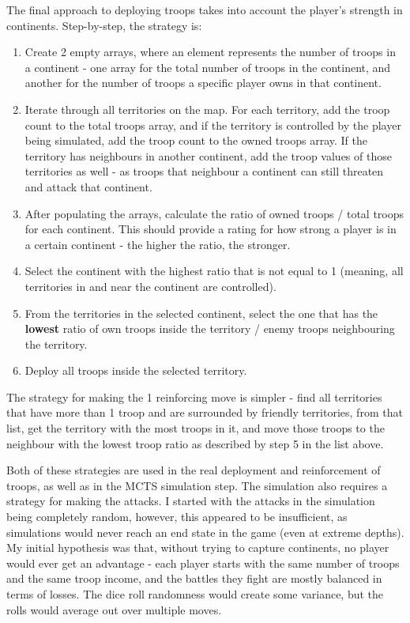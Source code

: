 The final approach to deploying troops takes into account the player's strength in continents. Step-by-step, the strategy is:
\begin{enumerate}
\item Create 2 empty arrays, where an element represents the number of troops in a continent - one array for the total number of troops in the continent, and another for the number of troops a specific player owns in that continent.
\item Iterate through all territories on the map. For each territory, add the troop count to the total troops array, and if the territory is controlled by the player being simulated, add the troop count to the owned troops array. If the territory has neighbours in another continent, add the troop values of those territories as well - as troops that neighbour a continent can still threaten and attack that continent.
\item After populating the arrays, calculate the ratio of owned troops / total troops for each continent. This should provide a rating for how strong a player is in a certain continent - the higher the ratio, the stronger.
\item Select the continent with the highest ratio that is not equal to 1 (meaning, all territories in and near the continent are controlled).
\item From the territories in the selected continent, select the one that has the \textbf{lowest} ratio of own troops inside the territory / enemy troops neighbouring the territory.
\item Deploy all troops inside the selected territory.
\end{enumerate}

The strategy for making the 1 reinforcing move is simpler - find all territories that have more than 1 troop and are surrounded by friendly territories, from that list, get the territory with the most troops in it, and move those troops to the neighbour with the lowest troop ratio as described by step 5 in the list above.

Both of these strategies are used in the real deployment and reinforcement of troops, as well as in the MCTS simulation step. The simulation also requires a strategy for making the attacks. I started with the attacks in the simulation being completely random, however, this appeared to be insufficient, as simulations would never reach an end state in the game (even at extreme depths). My initial hypothesis was that, without trying to capture continents, no player would ever get an advantage - each player starts with the same number of troops and the same troop income, and the battles they fight are mostly balanced in terms of losses. The dice roll randomness would create some variance, but the rolls would average out over multiple moves.

